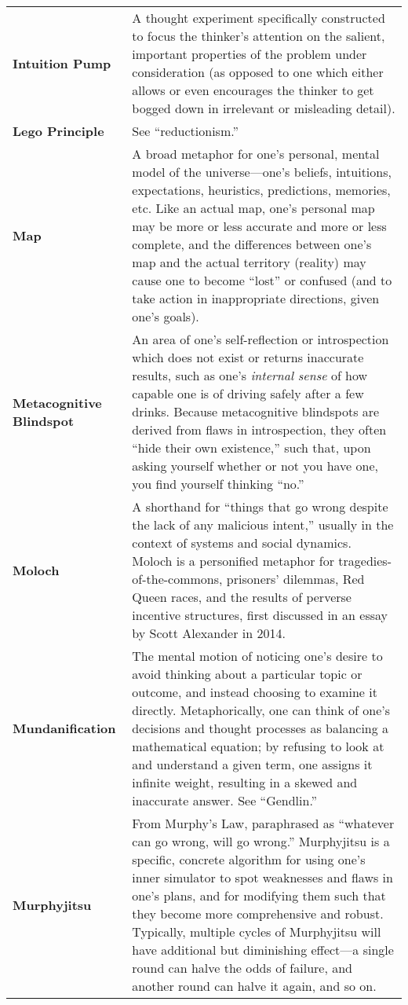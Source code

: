 \begin{longtable} { p{} p{} }
\textbf{Intuition Pump} & A thought experiment specifically constructed to focus the thinker's attention on the salient, important properties of the problem under consideration (as opposed to one which either allows or even encourages the thinker to get bogged down in irrelevant or misleading detail).\\

\textbf{Lego Principle} & See ``reductionism.''\\

\textbf{Map} & A broad metaphor for one's personal, mental model of the universe---one's beliefs, intuitions, expectations, heuristics, predictions, memories, etc.  Like an actual map, one's personal map may be more or less accurate and more or less complete, and the differences between one's map and the actual territory (reality) may cause one to become ``lost'' or confused (and to take action in inappropriate directions, given one's goals).\\

\textbf{Metacognitive Blindspot} & An area of one's self-reflection or introspection which does not exist or returns inaccurate results, such as one's \emph{internal sense} of how capable one is of driving safely after a few drinks.  Because metacognitive blindspots are derived from flaws in introspection, they often ``hide their own existence,'' such that, upon asking yourself whether or not you have one, you find yourself thinking ``no.''\\

\textbf{Moloch} & A shorthand for ``things that go wrong despite the lack of any malicious intent,'' usually in the context of systems and social dynamics.  Moloch is a personified metaphor for tragedies-of-the-commons, prisoners' dilemmas, Red Queen races, and the results of perverse incentive structures, first discussed in an essay by Scott Alexander in 2014.\\

\textbf{Mundanification} & The mental motion of noticing one's desire to avoid thinking about a particular topic or outcome, and instead choosing to examine it directly.  Metaphorically, one can think of one's decisions and thought processes as balancing a mathematical equation; by refusing to look at and understand a given term, one assigns it infinite weight, resulting in a skewed and inaccurate answer.  See ``Gendlin.''\\

\textbf{Murphyjitsu} & From Murphy's Law, paraphrased as ``whatever can go wrong, will go wrong.''  Murphyjitsu is a specific, concrete algorithm for using one's inner simulator to spot weaknesses and flaws in one's plans, and for modifying them such that they become more comprehensive and robust.  Typically, multiple cycles of Murphyjitsu will have additional but diminishing effect---a single round can halve the odds of failure, and another round can halve it again, and so on.\\


\end{longtable}
